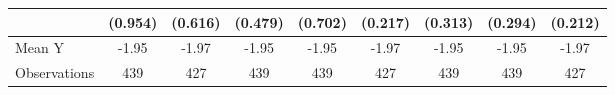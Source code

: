 {\begin{tabular}{l*{8}{c}}
            &     (0.954)         &     (0.616)         &     (0.479)         &     (0.702)         &     (0.217)         &     (0.313)         &     (0.294)         &     (0.212)         \\
\midrule
Mean Y      &       -1.95         &       -1.97         &       -1.95         &       -1.95         &       -1.97         &       -1.95         &       -1.95         &       -1.97         \\
Observations&         439         &         427         &         439         &         439         &         427         &         439         &         439         &         427         \\
\bottomrule
\end{tabular}
}

